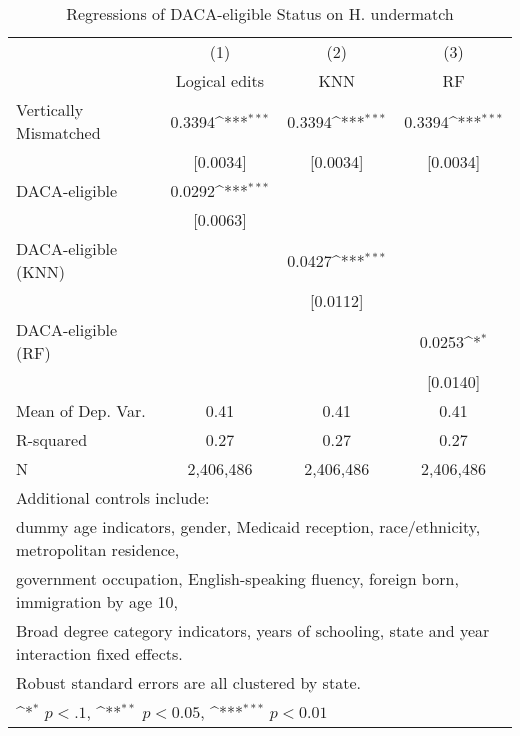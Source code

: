 \begin{table}[htbp]\centering
\def\sym#1{\ifmmode^{#1}\else\(^{#1}\)\fi}
\caption{Regressions of DACA-eligible Status on H. undermatch}
\begin{tabular}{l*{3}{c}}
\toprule
                    &\multicolumn{1}{c}{(1)}         &\multicolumn{1}{c}{(2)}         &\multicolumn{1}{c}{(3)}         \\
                    &Logical edits         &         KNN         &          RF         \\
\midrule
Vertically Mismatched&      0.3394\sym{***}&      0.3394\sym{***}&      0.3394\sym{***}\\
                    &    [0.0034]         &    [0.0034]         &    [0.0034]         \\
\addlinespace
DACA-eligible       &      0.0292\sym{***}&                     &                     \\
                    &    [0.0063]         &                     &                     \\
\addlinespace
DACA-eligible (KNN) &                     &      0.0427\sym{***}&                     \\
                    &                     &    [0.0112]         &                     \\
\addlinespace
DACA-eligible (RF)  &                     &                     &      0.0253\sym{*}  \\
                    &                     &                     &    [0.0140]         \\
\midrule
Mean of Dep. Var.   &        0.41         &        0.41         &        0.41         \\
R-squared           &        0.27         &        0.27         &        0.27         \\
N                   &   2,406,486         &   2,406,486         &   2,406,486         \\
\bottomrule
\multicolumn{4}{l}{\footnotesize Additional controls include:}\\
\multicolumn{4}{l}{\footnotesize dummy age indicators, gender, Medicaid reception, race/ethnicity, metropolitan residence,}\\
\multicolumn{4}{l}{\footnotesize government occupation, English-speaking fluency, foreign born, immigration by age 10,}\\
\multicolumn{4}{l}{\footnotesize Broad degree category indicators, years of schooling, state and year interaction fixed effects.}\\
\multicolumn{4}{l}{\footnotesize Robust standard errors are all clustered by state.}\\
\multicolumn{4}{l}{\footnotesize \sym{*} \(p<.1\), \sym{**} \(p<0.05\), \sym{***} \(p<0.01\)}\\
\end{tabular}
\end{table}
